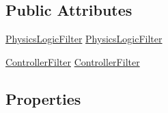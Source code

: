 \subsection*{Public Attributes}
\begin{DoxyCompactItemize}
\item 
\hyperlink{struct_farseer_physics_1_1_common_1_1_physics_logic_1_1_physics_logic_filter}{Physics\+Logic\+Filter} \hyperlink{class_farseer_physics_1_1_dynamics_1_1_body_a9c8ca7305a43003e26afc43e1fa88e22}{Physics\+Logic\+Filter}
\item 
\hyperlink{struct_farseer_physics_1_1_controllers_1_1_controller_filter}{Controller\+Filter} \hyperlink{class_farseer_physics_1_1_dynamics_1_1_body_a38ed721c44280d3752f9fa44df47d9fb}{Controller\+Filter}
\end{DoxyCompactItemize}
\subsection*{Properties}
